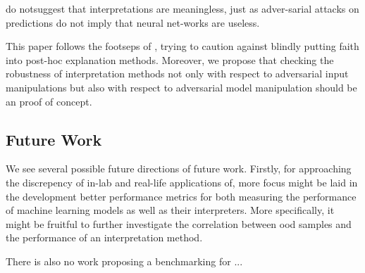 do  notsuggest that interpretations are meaningless, just as adver-sarial  attacks  on  predictions  do  not  imply  that  neural  net-works are useless. 

This paper follows the footseps of \cite{lipton2018mythos}, trying to caution against blindly putting faith into post-hoc explanation methods. 
Moreover, we propose that checking the robustness of interpretation methods not only with respect to adversarial input manipulations but also with respect to adversarial model manipulation should be an proof of concept. 




\subsection{Future Work}
We see several possible future directions of future work. 
Firstly, for approaching the discrepency of in-lab and real-life applications of, more focus might be laid in the development better performance metrics for both measuring the performance of machine learning models as well as their interpreters. 
More specifically, it might be fruitful to further investigate the correlation between ood samples and the performance of an interpretation method.


There is also no work proposing a benchmarking for ... 